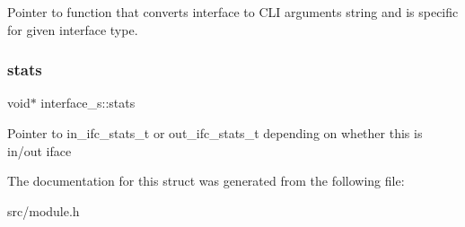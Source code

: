 Pointer to function that converts interface to C\+LI arguments string and is specific for given interface type. \mbox{\label{structinterface__s_a9a2a9a22fe2818ec3cdd1a9f053c5dfc}} 
\subsubsection{\texorpdfstring{stats}{stats}}
{\footnotesize\ttfamily void$\ast$ interface\+\_\+s\+::stats}

Pointer to in\+\_\+ifc\+\_\+stats\+\_\+t or out\+\_\+ifc\+\_\+stats\+\_\+t depending on whether this is in/out iface 

The documentation for this struct was generated from the following file\+:\begin{DoxyCompactItemize}
\item 
src/module.\+h\end{DoxyCompactItemize}

